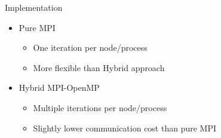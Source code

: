 \documentclass[]{beamer}
\begin{document}
\begin{frame}{Implementation}

  \begin{itemize}

  \item Pure MPI
    \begin{itemize}
    \item One iteration per node/process
    \item More flexible than Hybrid approach
    \end{itemize}
    
  \item Hybrid MPI-OpenMP
    \begin{itemize}
    \item Multiple iterations per node/process
    \item Slightly lower communication cost than pure MPI
    \end{itemize}

  \end{itemize}

\end{frame}







\end{document}
